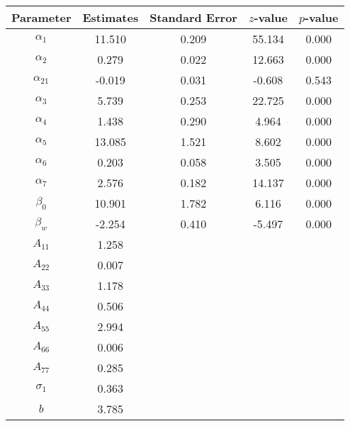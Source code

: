 \begin{table}[ht]
\centering
\begin{tabular}{ccccc}
  \hline
Parameter & Estimates & Standard Error & $z$-value & $p$-value \\ 
  \hline
$\alpha_1$ & 11.510 & 0.209 & 55.134 & 0.000 \\ 
  $\alpha_2$ & 0.279 & 0.022 & 12.663 & 0.000 \\ 
  $\alpha_{21}$ & -0.019 & 0.031 & -0.608 & 0.543 \\ 
  $\alpha_3$ & 5.739 & 0.253 & 22.725 & 0.000 \\ 
  $\alpha_4$ & 1.438 & 0.290 & 4.964 & 0.000 \\ 
  $\alpha_5$ & 13.085 & 1.521 & 8.602 & 0.000 \\ 
  $\alpha_6$ & 0.203 & 0.058 & 3.505 & 0.000 \\ 
  $\alpha_7$ & 2.576 & 0.182 & 14.137 & 0.000 \\ 
  $\beta_0$ & 10.901 & 1.782 & 6.116 & 0.000 \\ 
  $\beta_w$ & -2.254 & 0.410 & -5.497 & 0.000 \\ 
  $A_{11}$ & 1.258 &  &  &  \\ 
  $A_{22}$ & 0.007 &  &  &  \\ 
  $A_{33}$ & 1.178 &  &  &  \\ 
  $A_{44}$ & 0.506 &  &  &  \\ 
  $A_{55}$ & 2.994 &  &  &  \\ 
  $A_{66}$ & 0.006 &  &  &  \\ 
  $A_{77}$ & 0.285 &  &  &  \\ 
  $\sigma_1$ & 0.363 &  &  &  \\ 
  $b$ & 3.785 &  &  &  \\ 
   \hline
\end{tabular}
\end{table}
